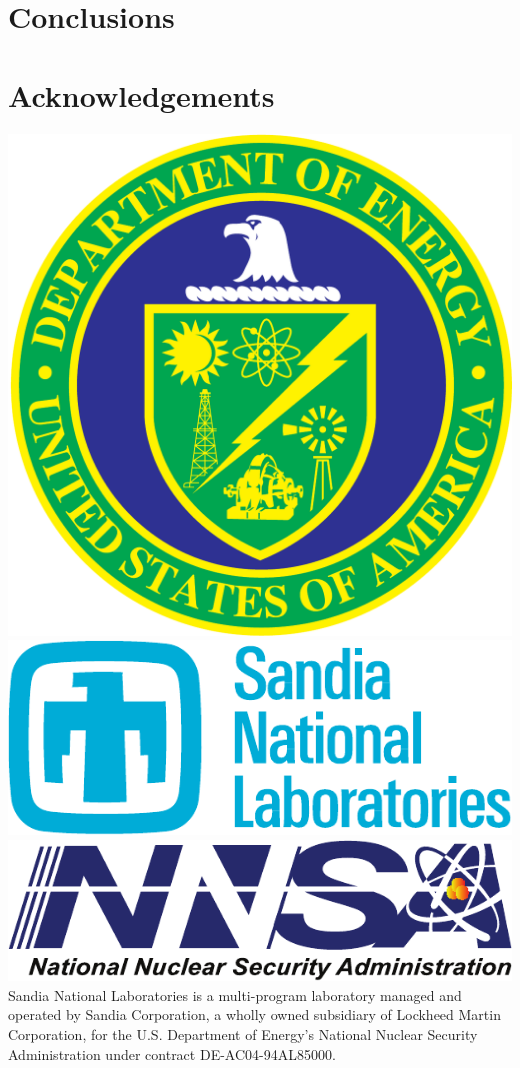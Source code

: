 \documentclass{sig-alt-gov2}
\begin{document}
\section{Conclusions}
\label{sec:conclusion}

\section{Acknowledgements}

\includegraphics[scale=0.07]{logos/doe_logo}
\includegraphics[scale=0.30]{logos/snl_logo}
\includegraphics[scale=0.35]{logos/nnsa_logo}
Sandia National Laboratories is a multi-program laboratory managed and operated
by Sandia Corporation, a wholly owned subsidiary of Lockheed Martin
Corporation, for the U.S. Department of Energy's National Nuclear Security
Administration under contract DE-AC04-94AL85000.




\vfill\eject
\end{document}
